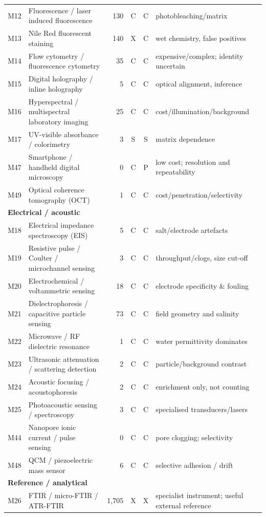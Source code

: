 \begin{longtable}{@{}p{.8cm}p{6.0cm}rccp{5.4cm}@{}}
M12 & Fluorescence / laser induced fluorescence & 130 & C & C & photobleaching/matrix \\
M13 & Nile Red fluorescent staining & 140 & X & C & wet chemistry, false positives \\
M14 & Flow cytometry / fluorescence cytometry & 35 & C & C & expensive/complex; identity uncertain \\
M15 & Digital holography / inline holography & 5 & C & C & optical alignment, inference \\
M16 & Hyperspectral / multispectral laboratory imaging & 25 & C & C & cost/illumination/background \\
M17 & UV-visible absorbance / colorimetry & 3 & S & S & matrix dependence \\
M47 & Smartphone / handheld digital microscopy & 0 & C & P & low cost; resolution and repeatability \\
M49 & Optical coherence tomography (OCT) & 1 & C & C & cost/penetration/selectivity \\
\multicolumn{6}{l}{\textbf{Electrical / acoustic}}\\[2pt]
M18 & Electrical impedance spectroscopy (EIS) & 5 & C & C & salt/electrode artefacts \\
M19 & Resistive pulse / Coulter / microchannel sensing & 3 & C & C & throughput/clogs, size cut-off \\
M20 & Electrochemical / voltammetric sensing & 18 & C & C & electrode specificity \& fouling \\
M21 & Dielectrophoresis / capacitive particle sensing & 73 & C & C & field geometry and salinity \\
M22 & Microwave / RF dielectric resonance & 1 & C & C & water permittivity dominates \\
M23 & Ultrasonic attenuation / scattering detection & 2 & C & C & particle/background contrast \\
M24 & Acoustic focusing / acoustophoresis & 2 & C & C & enrichment only, not counting \\
M25 & Photoacoustic sensing / spectroscopy & 3 & C & C & specialised transducers/lasers \\
M44 & Nanopore ionic current / pulse sensing & 0 & C & C & pore clogging; selectivity \\
M48 & QCM / piezoelectric mass sensor & 6 & C & C & selective adhesion / drift \\
\multicolumn{6}{l}{\textbf{Reference / analytical}}\\[2pt]
M26 & FTIR / micro-FTIR / ATR-FTIR & 1,705 & X & X & specialist instrument; useful external reference \\

\end{longtable}
